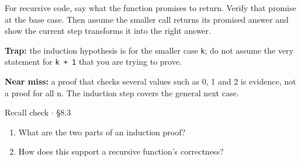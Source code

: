 \documentclass[11pt]{article}
\begin{document}
\begin{keepsection}
For recursive code, say what the function promises to return. Verify that promise at the base case. Then assume the smaller call returns its promised answer and show the current step transforms it into the right answer.

\begin{notebox}\textbf{Trap:} the induction hypothesis is for the smaller case \texttt{k}; do not assume the very statement for \texttt{k + 1} that you are trying to prove.\end{notebox}

\begin{notebox}\textbf{Near miss:} a proof that checks several values such as 0, 1 and 2 is evidence, not a proof for all n. The induction step covers the general next case.\end{notebox}

\begin{recallbox}{Recall check \ensuremath{\cdot} §8.3}
\begin{enumerate}
\item What are the two parts of an induction proof?
\item How does this support a recursive function’s correctness?
\end{enumerate}

\end{recallbox}
\end{keepsection}
\end{document}
